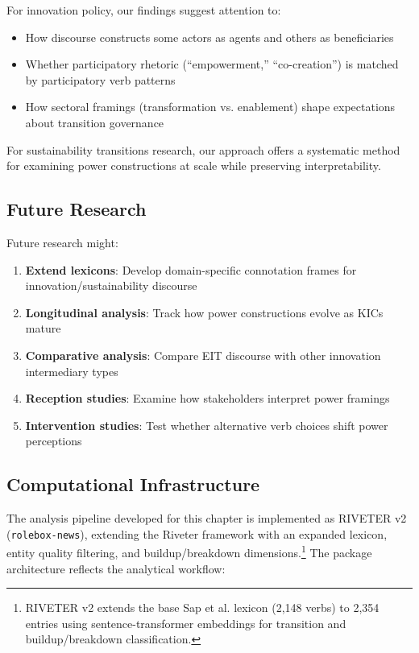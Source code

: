 \documentclass[../main.tex]{subfiles}
\begin{document}
For innovation policy, our findings suggest attention to:

\begin{itemize}
    \item How discourse constructs some actors as agents and others as beneficiaries
    \item Whether participatory rhetoric (``empowerment,'' ``co-creation'') is matched by participatory verb patterns
    \item How sectoral framings (transformation vs. enablement) shape expectations about transition governance
\end{itemize}

For sustainability transitions research, our approach offers a systematic method for examining power constructions at scale while preserving interpretability.

\subsection{Future Research}

Future research might:

\begin{enumerate}
    \item \textbf{Extend lexicons}: Develop domain-specific connotation frames for innovation/sustainability discourse
    \item \textbf{Longitudinal analysis}: Track how power constructions evolve as KICs mature
    \item \textbf{Comparative analysis}: Compare EIT discourse with other innovation intermediary types
    \item \textbf{Reception studies}: Examine how stakeholders interpret power framings
    \item \textbf{Intervention studies}: Test whether alternative verb choices shift power perceptions
\end{enumerate}

\subsection{Computational Infrastructure}

The analysis pipeline developed for this chapter is implemented as RIVETER v2 (\texttt{rolebox-news}), extending the Riveter framework \cite{antoniak2023riveter} with an expanded lexicon, entity quality filtering, and buildup/breakdown dimensions.\footnote{RIVETER v2 extends the base Sap et al. lexicon (2,148 verbs) to 2,354 entries using sentence-transformer embeddings for transition and buildup/breakdown classification.} The package architecture reflects the analytical workflow:
\end{document}
